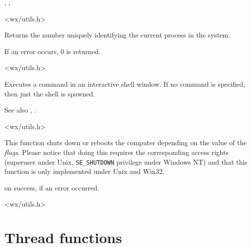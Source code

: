 ,\rtfsp
{},\rtfsp
{}


<wx/utils.h>


\label{wxgetprocessid}


Returns the number uniquely identifying the current process in the system.

If an error occurs, $0$ is returned.


<wx/utils.h>


\label{wxshell}


Executes a command in an interactive shell window. If no command is
specified, then just the shell is spawned.

See also , .


<wx/utils.h>


\label{wxshutdown}


This function shuts down or reboots the computer depending on the value of the
{\it flags}. Please notice that doing this requires the corresponding access
rights (superuser under Unix, {\tt SE\_SHUTDOWN} privilege under Windows NT)
and that this function is only implemented under Unix and Win32.




\true on success, \false if an error occurred.


<wx/utils.h>



\section{Thread functions}\label{threadfunctions}

